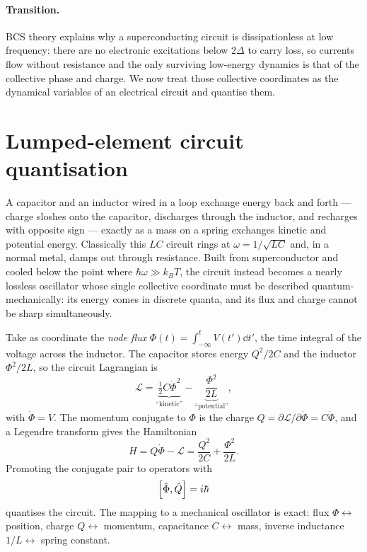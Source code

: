 \paragraph{Transition.}
BCS theory explains why a superconducting circuit is dissipationless
at low frequency: there are no electronic excitations below $2\Delta$
to carry loss, so currents flow without resistance and the only
surviving low-energy dynamics is that of the collective phase and
charge. We now treat those collective coordinates as the dynamical
variables of an electrical circuit and quantise them.

\section{Lumped-element circuit quantisation}
\label{sec:circuit-quantisation}

\begin{phenomenon}
A capacitor and an inductor wired in a loop exchange energy back and
forth --- charge sloshes onto the capacitor, discharges through the
inductor, and recharges with opposite sign --- exactly as a mass on a
spring exchanges kinetic and potential energy. Classically this $LC$
circuit rings at $\omega=1/\sqrt{LC}$ and, in a normal metal, damps
out through resistance. Built from superconductor and cooled below
the point where $\hbar\omega\gg k_BT$, the circuit instead becomes a
nearly lossless oscillator whose single collective coordinate must be
described quantum-mechanically: its energy comes in discrete quanta,
and its flux and charge cannot be sharp simultaneously.
\end{phenomenon}

\begin{statement}
\label{stmt:circuit-quantisation}
Take as coordinate the \emph{node flux}
$\Phi(t)=\int_{-\infty}^{t}V(t')\dd t'$, the time integral of the
voltage across the inductor. The capacitor stores energy
$Q^2/2C$ and the inductor $\Phi^2/2L$, so the circuit Lagrangian is
\begin{equation}
\label{eq:lc-lagrangian}
\mathcal L = \underbrace{\tfrac12 C\dot\Phi^2}_{\text{``kinetic''}}
  - \underbrace{\frac{\Phi^2}{2L}}_{\text{``potential''}},
\end{equation}
with $\dot\Phi=V$. The momentum conjugate to $\Phi$ is the charge
$Q=\partial\mathcal L/\partial\dot\Phi = C\dot\Phi$, and a Legendre
transform gives the Hamiltonian
\begin{equation}
\label{eq:lc-hamiltonian}
H = Q\dot\Phi - \mathcal L = \frac{Q^2}{2C} + \frac{\Phi^2}{2L}.
\end{equation}
Promoting the conjugate pair to operators with
\begin{equation}
\label{eq:flux-charge-commutator}
\comm{\op\Phi}{\op Q} = i\hbar
\end{equation}
quantises the circuit. The mapping to a mechanical oscillator is
exact: flux $\Phi\leftrightarrow$ position, charge
$Q\leftrightarrow$ momentum, capacitance $C\leftrightarrow$ mass,
inverse inductance $1/L\leftrightarrow$ spring constant.
\end{statement}

